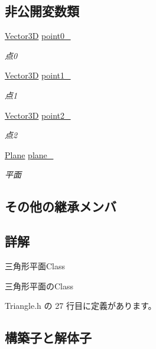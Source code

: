 \subsection*{非公開変数類}
\begin{DoxyCompactItemize}
\item 
\mbox{\hyperlink{class_vector3_d}{Vector3D}} \mbox{\hyperlink{class_triangle_a307e9043e9755e06387458cd84993662}{point0\+\_\+}}
\begin{DoxyCompactList}\small\item\em 点0 \end{DoxyCompactList}\item 
\mbox{\hyperlink{class_vector3_d}{Vector3D}} \mbox{\hyperlink{class_triangle_aa846eb6b25478f0227225c74c53bb5c1}{point1\+\_\+}}
\begin{DoxyCompactList}\small\item\em 点1 \end{DoxyCompactList}\item 
\mbox{\hyperlink{class_vector3_d}{Vector3D}} \mbox{\hyperlink{class_triangle_af1850003b6274357b9b081395e1ab4e8}{point2\+\_\+}}
\begin{DoxyCompactList}\small\item\em 点2 \end{DoxyCompactList}\item 
\mbox{\hyperlink{class_plane}{Plane}} \mbox{\hyperlink{class_triangle_a93586199c2c173771f2e167f477eaa70}{plane\+\_\+}}
\begin{DoxyCompactList}\small\item\em 平面 \end{DoxyCompactList}\end{DoxyCompactItemize}
\subsection*{その他の継承メンバ}


\subsection{詳解}
三角形平面\+Class 

三角形平面の\+Class 

 Triangle.\+h の 27 行目に定義があります。



\subsection{構築子と解体子}
\mbox{\label{class_triangle_aaefe4ed500c07918d30c6f0e286332c5}} 
